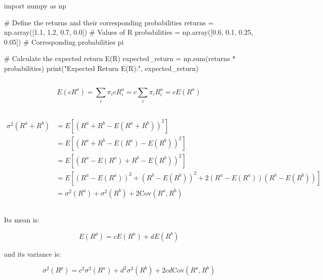 \begin{python}
import numpy as np

# Define the returns and their corresponding probabilities
returns = np.array([1.1, 1.2, 0.7, 0.0])  # Values of R
probabilities = np.array([0.6, 0.1, 0.25, 0.05])  # Corresponding probabilities pi

# Calculate the expected return E(R)
expected_return = np.sum(returns * probabilities)
print("Expected Return E(R):", expected_return)
\end{python}


\subsection{}

\begin{equation}
    E(cR^a) = \sum_i \pi_i c R^a_i  = c\sum_i  \pi_i R^a_i = cE(R^a)
\end{equation}

\subsection{}

\begin{align}
    \sigma^2(R^a + R^b) &= E[(R^a + R^b - E(R^a + R^b))^2] \\
    &= E[(R^a + R^b - E(R^a) - E(R^b))^2] \\
    &= E[(R^a - E(R^a) + R^b - E(R^b))^2] \\
    &= E[(R^a - E(R^a))^2 + (R^b - E(R^b))^2 + 2(R^a - E(R^a))(R^b - E(R^b))] \\
    &= \sigma^2(R^a) + \sigma^2(R^b) + 2\text{Cov}(R^a, R^b)
\end{align}

\subsection{}

Its mean is:

\begin{equation}
    E(R^p) = cE(R^a) + dE(R^b)
\end{equation}

and its variance is:

\begin{equation}
    \sigma^2(R^p) = c^2\sigma^2(R^a) + d^2\sigma^2(R^b) + 2cd\text{Cov}(R^a, R^b)
\end{equation}